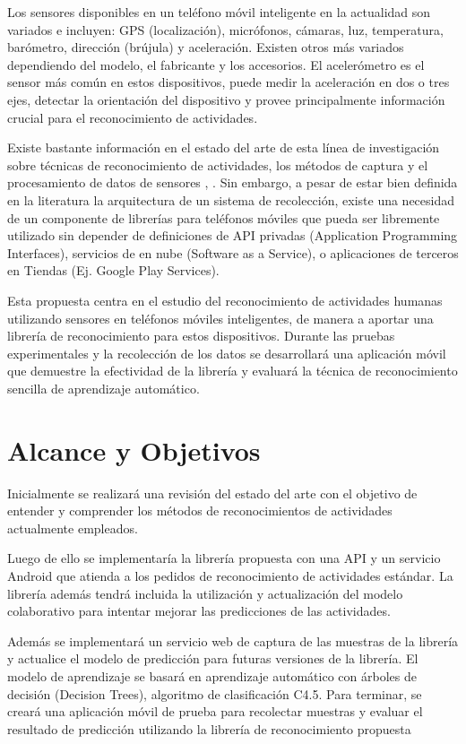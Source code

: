 Los sensores disponibles en un teléfono móvil inteligente en la actualidad
son variados e incluyen: GPS (localización), micrófonos, cámaras,
luz, temperatura, barómetro, dirección (brújula) y aceleración. Existen
otros más variados dependiendo del modelo, el fabricante y los accesorios.
El acelerómetro es el sensor más común en estos dispositivos, puede
medir la aceleración en dos o tres ejes, detectar la orientación del
dispositivo y provee principalmente información crucial para el reconocimiento
de actividades.

Existe bastante información en el estado del arte de esta línea de
investigación sobre técnicas de reconocimiento de actividades, los
métodos de captura y el procesamiento de datos de sensores \cite{LaraLabrador2012},
\cite{Kwapisz2011}. Sin embargo, a pesar de estar bien definida en
la literatura la arquitectura de un sistema de recolección, existe
una necesidad de un componente de librerías para teléfonos móviles
que pueda ser libremente utilizado sin depender de definiciones de
API privadas (Application Programming Interfaces), servicios de en
nube (Software as a Service), o aplicaciones de terceros en Tiendas
(Ej. Google Play Services).

Esta propuesta centra en el estudio del reconocimiento de actividades
humanas utilizando sensores en teléfonos móviles inteligentes, de
manera a aportar una librería de reconocimiento para estos dispositivos.
Durante las pruebas experimentales y la recolección de los datos se
desarrollará una aplicación móvil que demuestre la efectividad de
la librería y evaluará la técnica de reconocimiento sencilla de aprendizaje
automático.

\section{Alcance y Objetivos}

\label{alcance-y-objetivos}

Inicialmente se realizará una revisión del estado del arte con el
objetivo de entender y comprender los métodos de reconocimientos de
actividades actualmente empleados.

Luego de ello se implementaría la librería propuesta con una API y
un servicio Android que atienda a los pedidos de reconocimiento de
actividades estándar. La librería además tendrá incluida la utilización
y actualización del modelo colaborativo para intentar mejorar las
predicciones de las actividades.

Además se implementará un servicio web de captura de las muestras
de la librería y actualice el modelo de predicción para futuras versiones
de la librería. El modelo de aprendizaje se basará en aprendizaje
automático con árboles de decisión (Decision Trees), algoritmo de
clasificación C4.5. Para terminar, se creará una aplicación móvil
de prueba para recolectar muestras y evaluar el resultado de predicción
utilizando la librería de reconocimiento propuesta

